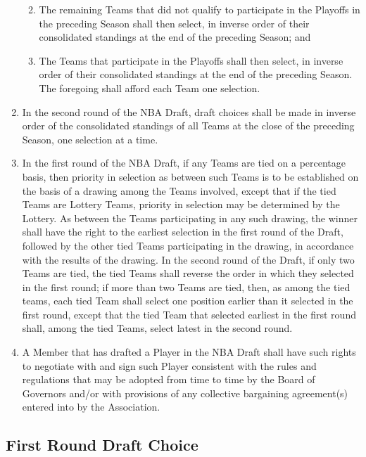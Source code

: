 \documentclass[]{book}
\providecommand{\tightlist}{%
  \setlength{\itemsep}{0pt}\setlength{\parskip}{0pt}}
\theoremstyle{definition}
\theoremstyle{definition}
\theoremstyle{definition}
\theoremstyle{remark}
\begin{document}
\begin{enumerate}
  \begin{enumerate}
  \def\labelenumii{(\roman{enumii})}
  \setcounter{enumii}{1}
  \tightlist
  \item
    The remaining Teams that did not qualify to participate in the
    Playoffs in the preceding Season shall then select, in inverse order
    of their consolidated standings at the end of the preceding Season;
    and
  \item
    The Teams that participate in the Playoffs shall then select, in
    inverse order of their consolidated standings at the end of the
    preceding Season. The foregoing shall afford each Team one
    selection.
  \end{enumerate}
\item
  In the second round of the NBA Draft, draft choices shall be made in
  inverse order of the consolidated standings of all Teams at the close
  of the preceding Season, one selection at a time.
\item
  In the first round of the NBA Draft, if any Teams are tied on a
  percentage basis, then priority in selection as between such Teams is
  to be established on the basis of a drawing among the Teams involved,
  except that if the tied Teams are Lottery Teams, priority in selection
  may be determined by the Lottery. As between the Teams participating
  in any such drawing, the winner shall have the right to the earliest
  selection in the first round of the Draft, followed by the other tied
  Teams participating in the drawing, in accordance with the results of
  the drawing. In the second round of the Draft, if only two Teams are
  tied, the tied Teams shall reverse the order in which they selected in
  the first round; if more than two Teams are tied, then, as among the
  tied teams, each tied Team shall select one position earlier than it
  selected in the first round, except that the tied Team that selected
  earliest in the first round shall, among the tied Teams, select latest
  in the second round.
\item
  A Member that has drafted a Player in the NBA Draft shall have such
  rights to negotiate with and sign such Player consistent with the
  rules and regulations that may be adopted from time to time by the
  Board of Governors and/or with provisions of any collective bargaining
  agreement(s) entered into by the Association.
\end{enumerate}

\subsection{First Round Draft Choice}\label{first-round-draft-choice}
\end{document}
